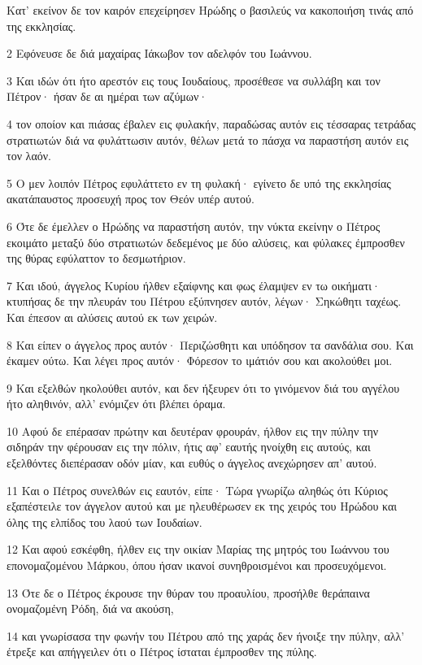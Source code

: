 \par Κατ' εκείνον δε τον καιρόν επεχείρησεν Ηρώδης ο βασιλεύς να κακοποιήση τινάς από της εκκλησίας.
\par 2 Εφόνευσε δε διά μαχαίρας Ιάκωβον τον αδελφόν του Ιωάννου.
\par 3 Και ιδών ότι ήτο αρεστόν εις τους Ιουδαίους, προσέθεσε να συλλάβη και τον Πέτρον· ήσαν δε αι ημέραι των αζύμων·
\par 4 τον οποίον και πιάσας έβαλεν εις φυλακήν, παραδώσας αυτόν εις τέσσαρας τετράδας στρατιωτών διά να φυλάττωσιν αυτόν, θέλων μετά το πάσχα να παραστήση αυτόν εις τον λαόν.
\par 5 Ο μεν λοιπόν Πέτρος εφυλάττετο εν τη φυλακή· εγίνετο δε υπό της εκκλησίας ακατάπαυστος προσευχή προς τον Θεόν υπέρ αυτού.
\par 6 Ότε δε έμελλεν ο Ηρώδης να παραστήση αυτόν, την νύκτα εκείνην ο Πέτρος εκοιμάτο μεταξύ δύο στρατιωτών δεδεμένος με δύο αλύσεις, και φύλακες έμπροσθεν της θύρας εφύλαττον το δεσμωτήριον.
\par 7 Και ιδού, άγγελος Κυρίου ήλθεν εξαίφνης και φως έλαμψεν εν τω οικήματι· κτυπήσας δε την πλευράν του Πέτρου εξύπνησεν αυτόν, λέγων· Σηκώθητι ταχέως. Και έπεσον αι αλύσεις αυτού εκ των χειρών.
\par 8 Και είπεν ο άγγελος προς αυτόν· Περιζώσθητι και υπόδησον τα σανδάλια σου. Και έκαμεν ούτω. Και λέγει προς αυτόν· Φόρεσον το ιμάτιόν σου και ακολούθει μοι.
\par 9 Και εξελθών ηκολούθει αυτόν, και δεν ήξευρεν ότι το γινόμενον διά του αγγέλου ήτο αληθινόν, αλλ' ενόμιζεν ότι βλέπει όραμα.
\par 10 Αφού δε επέρασαν πρώτην και δευτέραν φρουράν, ήλθον εις την πύλην την σιδηράν την φέρουσαν εις την πόλιν, ήτις αφ' εαυτής ηνοίχθη εις αυτούς, και εξελθόντες διεπέρασαν οδόν μίαν, και ευθύς ο άγγελος ανεχώρησεν απ' αυτού.
\par 11 Και ο Πέτρος συνελθών εις εαυτόν, είπε· Τώρα γνωρίζω αληθώς ότι Κύριος εξαπέστειλε τον άγγελον αυτού και με ηλευθέρωσεν εκ της χειρός του Ηρώδου και όλης της ελπίδος του λαού των Ιουδαίων.
\par 12 Και αφού εσκέφθη, ήλθεν εις την οικίαν Μαρίας της μητρός του Ιωάννου του επονομαζομένου Μάρκου, όπου ήσαν ικανοί συνηθροισμένοι και προσευχόμενοι.
\par 13 Ότε δε ο Πέτρος έκρουσε την θύραν του προαυλίου, προσήλθε θεράπαινα ονομαζομένη Ρόδη, διά να ακούση,
\par 14 και γνωρίσασα την φωνήν του Πέτρου από της χαράς δεν ήνοιξε την πύλην, αλλ' έτρεξε και απήγγειλεν ότι ο Πέτρος ίσταται έμπροσθεν της πύλης.
